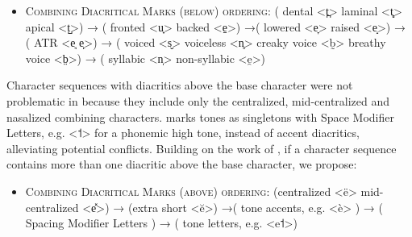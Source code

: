 \begin{itemize}
	\itemsep1pt\parskip0pt 
	\item \textsc{Combining Diacritical Marks (below) ordering:} ( dental <t̪> \textbar{} laminal <t̻> \textbar{} apical <t̺>) → ( fronted <u̟> \textbar{} backed <e̠>) →( lowered <e̞> \textbar{} raised <e̝>) → ( ATR <e̘ e̙>) → ( voiced <s̬> \textbar{} voiceless <n̥> \textbar{} creaky voice <b̰> \textbar{} breathy voice <b̤>) → ( syllabic <n̩> \textbar{} non-syllabic <e̯>) 
\end{itemize}

Character sequences with diacritics above the base character were not problematic in \citet{Moran2012} because they include only the centralized, mid-centralized and nasalized combining characters. \citet{Moran2012} marks tones as singletons with Space Modifier Letters, e.g. \textless{}˦\textgreater{} for a phonemic high tone, instead of accent diacritics, alleviating potential conflicts. Building on the work of \citet{Moran2012}, if a character sequence contains more than one diacritic above the base character, we propose:

\begin{itemize}
	\itemsep1pt\parskip0pt 
	\item \textsc{Combining Diacritical Marks (above) ordering:} (centralized <ë> \textbar{} mid-centralized <e̽>) → (extra short <ĕ>) →( tone accents, e.g. <è> ) → ( Spacing Modifier Letters ) → ( tone letters, e.g. <e˦>) 
\end{itemize}